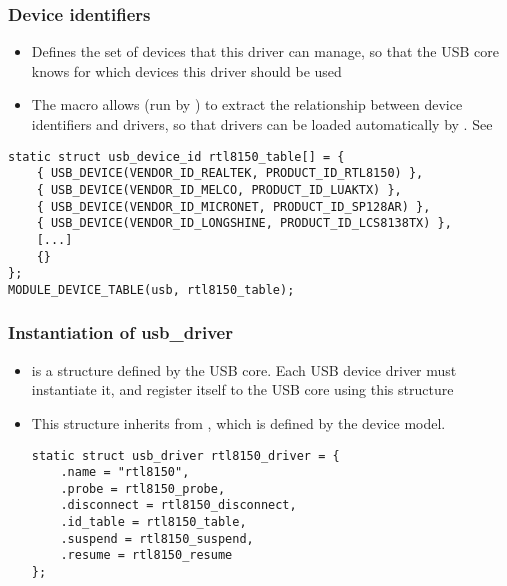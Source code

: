\begin{frame}[fragile]
  \frametitle{Device identifiers}
  \begin{itemize}
  \item Defines the set of devices that this driver can manage, so
    that the USB core knows for which devices this driver should be
    used
  \item The  macro allows 
    (run by ) to extract the relationship
    between device identifiers and drivers, so that drivers can be
    loaded automatically by .
    See 
  \end{itemize}
  \begin{block}{}
  \begin{verbatim}
static struct usb_device_id rtl8150_table[] = {
    { USB_DEVICE(VENDOR_ID_REALTEK, PRODUCT_ID_RTL8150) },
    { USB_DEVICE(VENDOR_ID_MELCO, PRODUCT_ID_LUAKTX) },
    { USB_DEVICE(VENDOR_ID_MICRONET, PRODUCT_ID_SP128AR) },
    { USB_DEVICE(VENDOR_ID_LONGSHINE, PRODUCT_ID_LCS8138TX) },
    [...]
    {}
};
MODULE_DEVICE_TABLE(usb, rtl8150_table);
  \end{verbatim}
  \end{block}
\end{frame}

\begin{frame}[fragile]
  \frametitle{Instantiation of usb\_driver}
  \begin{itemize}
  \item {} is a structure defined by the USB
    core. Each USB device driver must instantiate it, and register
    itself to the USB core using this structure
  \item This structure inherits from ,
    which is defined by the device model.
    \begin{block}{}
  \begin{verbatim}
static struct usb_driver rtl8150_driver = {
    .name = "rtl8150",
    .probe = rtl8150_probe,
    .disconnect = rtl8150_disconnect,
    .id_table = rtl8150_table,
    .suspend = rtl8150_suspend,
    .resume = rtl8150_resume
};
  \end{verbatim}
  \end{block}
  \end{itemize}
\end{frame}

